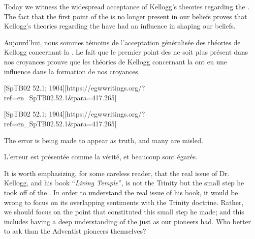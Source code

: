 Today we witness the widespread acceptance of Kellogg’s theories regarding the . The fact that the first point of the  is no longer present in our beliefs proves that Kellogg’s theories regarding the  have had an influence in shaping our beliefs.


Aujourd'hui, nous sommes témoins de l'acceptation généralisée des théories de Kellogg concernant la . Le fait que le premier point des  ne soit plus présent dans nos croyances prouve que les théories de Kellogg concernant la  ont eu une influence dans la formation de nos croyances.


[SpTB02 52.1; 1904][https://egwwritings.org/?ref=en\_SpTB02.52.1&para=417.265]


[SpTB02 52.1; 1904][https://egwwritings.org/?ref=en\_SpTB02.52.1&para=417.265]


The error is being made to appear as truth, and many are misled.


L'erreur est présentée comme la vérité, et beaucoup sont égarés.


It is worth emphasizing, for some careless reader, that the real issue of Dr. Kellogg, and his book “\textit{Living Temple}”, is not the Trinity but the small step he took off of the . In order to understand the real issue of his book, it would be wrong to focus on its overlapping sentiments with the Trinity doctrine. Rather, we should focus on the point that constituted this small step he made; and this includes having a deep understanding of the  just as our pioneers had. Who better to ask than the Adventist pioneers themselves?


